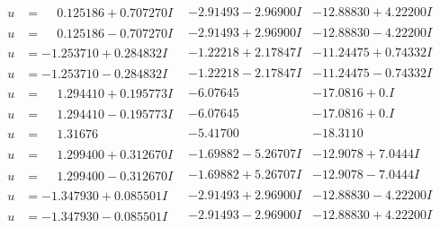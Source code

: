 \documentclass[1p]{elsarticle_modified}
\theoremstyle{definition}
\begin{document}
$$\begin{array}{c|c|c}
\begin{aligned}
u &= \phantom{-}0.125186 + 0.707270 I\end{aligned}
 & -2.91493 - 2.96900 I & -12.88830 + 4.22200 I \\ \hline\begin{aligned}
u &= \phantom{-}0.125186 - 0.707270 I\end{aligned}
 & -2.91493 + 2.96900 I & -12.88830 - 4.22200 I \\ \hline\begin{aligned}
u &= -1.253710 + 0.284832 I\end{aligned}
 & -1.22218 + 2.17847 I & -11.24475 + 0.74332 I \\ \hline\begin{aligned}
u &= -1.253710 - 0.284832 I\end{aligned}
 & -1.22218 - 2.17847 I & -11.24475 - 0.74332 I \\ \hline\begin{aligned}
u &= \phantom{-}1.294410 + 0.195773 I\end{aligned}
 & -6.07645\phantom{ +0.000000I} & -17.0816 + 0. I\phantom{ +0.000000I} \\ \hline\begin{aligned}
u &= \phantom{-}1.294410 - 0.195773 I\end{aligned}
 & -6.07645\phantom{ +0.000000I} & -17.0816 + 0. I\phantom{ +0.000000I} \\ \hline\begin{aligned}
u &= \phantom{-}1.31676\phantom{ +0.000000I}\end{aligned}
 & -5.41700\phantom{ +0.000000I} & -18.3110\phantom{ +0.000000I} \\ \hline\begin{aligned}
u &= \phantom{-}1.299400 + 0.312670 I\end{aligned}
 & -1.69882 - 5.26707 I & -12.9078 + 7.0444 I \\ \hline\begin{aligned}
u &= \phantom{-}1.299400 - 0.312670 I\end{aligned}
 & -1.69882 + 5.26707 I & -12.9078 - 7.0444 I \\ \hline\begin{aligned}
u &= -1.347930 + 0.085501 I\end{aligned}
 & -2.91493 + 2.96900 I & -12.88830 - 4.22200 I \\ \hline\begin{aligned}
u &= -1.347930 - 0.085501 I\end{aligned}
 & -2.91493 - 2.96900 I & -12.88830 + 4.22200 I \\ \hline\begin{aligned}

\end{aligned}
\end{array}$$
\end{document}
